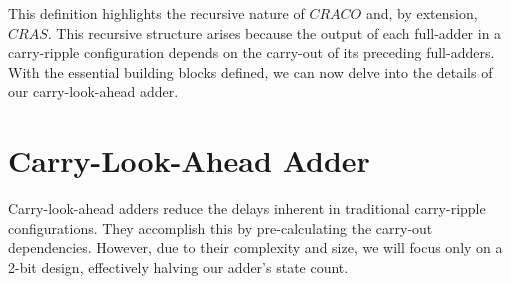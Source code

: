 \documentclass{article}
\begin{document}
This definition highlights the recursive nature of \( CRACO \) and, by extension, \( CRAS \). This recursive structure arises because the output of each full-adder in a carry-ripple configuration depends on the carry-out of its preceding full-adders. With the essential building blocks defined, we can now delve into the details of our carry-look-ahead adder.

\section{Carry-Look-Ahead Adder}
Carry-look-ahead adders reduce the delays inherent in traditional carry-ripple configurations. They accomplish this by pre-calculating the carry-out dependencies. However, due to their complexity and size, we will focus only on  a 2-bit design, effectively halving our adder's state count.
\end{document}

